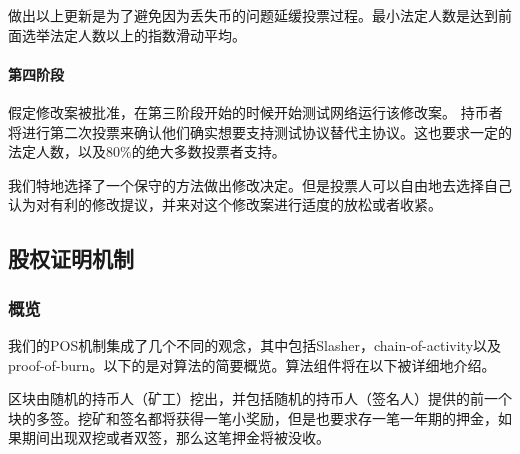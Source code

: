 \documentclass[letterpaper]{article}
\begin{document}
做出以上更新是为了避免因为丢失币的问题延缓投票过程。最小法定人数是达到前面选举法定人数以上的指数滑动平均。

\paragraph{第四阶段} %
假定修改案被批准，在第三阶段开始的时候开始测试网络运行该修改案。
持币者将进行第二次投票来确认他们确实想要支持测试协议替代主协议。这也要求一定的法定人数，以及$80\%$的绝大多数投票者支持。

我们特地选择了一个保守的方法做出修改决定。但是投票人可以自由地去选择自己认为对有利的修改提议，并来对这个修改案进行适度的放松或者收紧。

\subsection{股权证明机制}

\subsubsection{概览}

我们的POS机制集成了几个不同的观念，其中包括Slasher\cite{Slasher}，chain-of-activity\cite{CoA}以及proof-of-burn。以下的是对算法的简要概览。算法组件将在以下被详细地介绍。

区块由随机的持币人（矿工）挖出，并包括随机的持币人（签名人）提供的前一个块的多签。挖矿和签名都将获得一笔小奖励，但是也要求存一笔一年期的押金，如果期间出现双挖或者双签，那么这笔押金将被没收。
\end{document}
